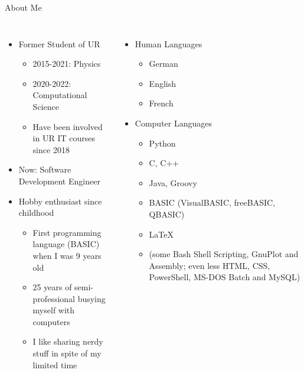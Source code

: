 \begin{frame}{About Me}
%
\begin{columns}[T]
\begin{itemize}
\item Former Student of UR
	\begin{itemize}
	\item 2015-2021: Physics
	\item 2020-2022: Computational Science
	\item Have been involved in UR IT courses since 2018
	\end{itemize}
\item Now: Software Development Engineer
\item Hobby enthusiast since childhood
	\begin{itemize}
	\item First programming language (BASIC) when I was 9 years old
	\item 25 years of semi-professional busying myself with computers
	\item I like sharing nerdy stuff in spite of my limited time
	\end{itemize}
\end{itemize}
%
\begin{itemize}
\item Human Languages
	\begin{itemize}
	\item German
	\item English
	\item French
	\end{itemize}
\item Computer Languages
	\begin{itemize}
	\item Python
	\item C, C++
	\item Java, Groovy
	\item BASIC (VisualBASIC, freeBASIC, QBASIC)
	\item \LaTeX
	\item (some Bash Shell Scripting, GnuPlot and Assembly; even less HTML, CSS, PowerShell, MS-DOS Batch and MySQL)
	\end{itemize}
\end{itemize}
\end{columns}
%
\end{frame}


